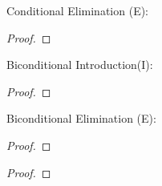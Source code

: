 Conditional Elimination ({\eif}E):

\begin{proof}
         
\end{proof}


Biconditional Introduction({\eiff}I):

\begin{proof}
        \open
                 
        \close
        \open
                 
        \close
\end{proof}



Biconditional Elimination ({\eiff}E):

\begin{multicols}{2}
\begin{proof}
         
\end{proof}

\begin{proof}
         
\end{proof}
\end{multicols}




